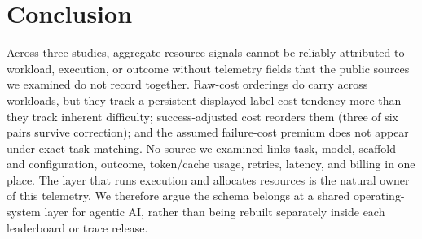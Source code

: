 \documentclass{article}
\begin{document}
\section{Conclusion}

Across three studies, aggregate resource signals cannot be reliably attributed to workload, execution, or outcome without telemetry fields that the public sources we examined do not record together. Raw-cost orderings do carry across workloads, but they track a persistent displayed-label cost tendency more than they track inherent difficulty; success-adjusted cost reorders them (three of six pairs survive correction); and the assumed failure-cost premium does not appear under exact task matching. No source we examined links task, model, scaffold and configuration, outcome, token/cache usage, retries, latency, and billing in one place. The layer that runs execution and allocates resources is the natural owner of this telemetry. We therefore argue the schema belongs at a shared operating-system layer for agentic AI, rather than being rebuilt separately inside each leaderboard or trace release.
\end{document}
